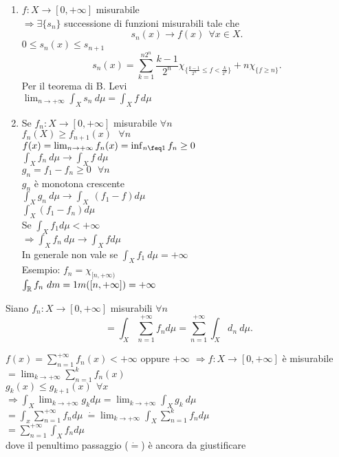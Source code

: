 \documentclass[12px]{article}
\begin{document}
		\begin{enumerate}
			\item $f: X \rightarrow [0,+\infty]$ misurabile\\
				$ \Rightarrow \exists \{s_n\}$ successione di funzioni misurabili tale che 
				 \[
				s_n(x) \rightarrow f(x) \ \ \forall x\in X
				.\] 
				$0\leq s_n(x)\leq s_{n+1}$
				 \[
				 s_n(x) = \sum^{n2^n}_{k = 1}\frac{k-1}{2^n}\chi_{\{\frac{k-1}{2^n}\leq f < \frac k{2^n}\}} + n \chi_{\{f\geq n\}}
				.\] 
				Per il teorema di B. Levi\\
				 $\lim_{n \rightarrow +\infty} \int_X s_n \ d\mu = \int_X f\ d\mu$\\
			 \item Se $f_n : X \rightarrow [0,+\infty]$ misurabile $\forall n$\\
				 $f_n(X) \geq f_{n+1} (x) \ \ \ \forall n$\\
				 $f(x) = \lim_{n \rightarrow + \infty} f_n(x) = \inf_{n\feq 1} f_n \geq 0$\\
				 $\int_X f_n \ d\mu \rightarrow\int_X f \ d\mu$\\
				 $g_n = f_1 - f_n \geq 0 \ \ \ \forall n$\\
				  $g_n$ è monotona crescente\\
				  $\int_X g_n \ d\mu \rightarrow \int_X \ (f_1- f)d\mu$\\
				  $\int_X (f_1-f_n)d\mu$\\
				  Se $\int_X f_1d\mu < +\infty$\\
				  $ \Rightarrow  \int_X f_n\ d\mu \rightarrow \int_X f d\mu$ \\
				  In generale non vale se $\int_X f_1\ d\mu = +\infty$\\
				  Esempio: $f_n = \chi_{[n,+\infty)}$\\
				  $\int_{\mathbb{R}} f_n\ dm = 1m([n,+\infty]) = +\infty$
		\end{enumerate}
		\begin{coro}
			Siano $f_n: X \rightarrow [0,+\infty]$ misurabili $\forall n$
			 \[
			= \int_X \sum^{+\infty}_{n = 1}f_n d\mu = \sum^{+\infty}_{n = 1}\int_X d_n\ d\mu
			.\] 
		\end{coro}
		\begin{dimo}
			$f(x) = \sum^{+\infty}_{n =1}f_n(x) <+\infty$ oppure $+\infty$ $ \Rightarrow f:X \rightarrow [0, + \infty]$ è misurabile\\
			$ = \lim_{k \rightarrow+\infty} \sum^{k}_{n = 1}f_n(x)$\\
			$g_k(x)\leq g_{k+1}(x)\ \ \forall x$\\
			$ \Rightarrow \int_X \lim_{k \rightarrow +\infty} g_k d\mu = \lim_{k \rightarrow +\infty}\int_X g_k \ d\mu$\\
			$ = \int_x \sum^{+\infty}_{n = 1}f_n d \mu \ \dot = \lim_{k \rightarrow +\infty}\int_X \sum^{k}_{n = 1}f_n d\mu$ \\
			$ = \sum^{+\infty}_{n = 1}\int_X f_n d\mu$\\
			dove il penultimo passaggio ($\dot =$) è ancora da giustificare 
		\end{dimo}
\end{document}
